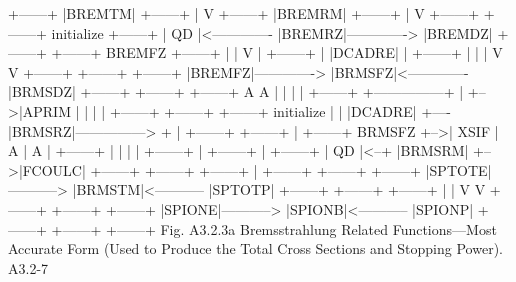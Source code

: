 \begin{center}
\begin{boxedverbatim}
                        +------+
                        |BREMTM|
                        +------+
                            |
                            V
                        +------+
                        |BREMRM|
                        +------+
                            |
                            V
 +------+               +------+  initialize   +------+
 |  QD  |<------------- |BREMRZ|-------------> |BREMDZ|
 +------+               +------+    BREMFZ     +------+
    |                                              |
    V                                              |
 +------+                                          |
 |DCADRE|                                          |
 +------+                                          |
    |                                              |
    V                                              V
 +------+               +------+               +------+
 |BREMFZ|-------------> |BRMSFZ|<------------- |BRMSDZ|
 +------+               +------+               +------+
                            A                    A |
                            |                    | |   +------+
            +---------------+                    | +-->|APRIM |
            |                                    | |   +------+
        +------+        +------+   initialize    | |
        |DCADRE|   +----|BRMSRZ|---------------> + |   +------+
        +------+   |    +------+     BRMSFZ        +-->| XSIF |
            A      |        A                      |   +------+
            |      |        |                      |
        +------+   |    +------+                   |   +------+
        |  QD  |<--+    |BRMSRM|                   +-->|FCOULC|
        +------+        +------+                       +------+
                            |
   +------+             +------+             +------+
   |SPTOTE|-----------> |BRMSTM|<----------- |SPTOTP|
   +------+             +------+             +------+
      |                                          |
      V                                          V
   +------+             +------+             +------+
   |SPIONE|-----------> |SPIONB|<----------- |SPIONP|
   +------+             +------+             +------+
Fig. A3.2.3a  Bremsstrahlung Related Functions---Most Accurate Form 
   (Used to Produce the Total Cross Sections and Stopping Power).
 A3.2-7
\end{boxedverbatim} 
\end{center}
\newpage {} 
